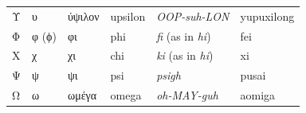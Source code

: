 \documentclass[../libro.tex]{subfiles}
\begin{document}
\begin{longtable}[c]{llllll}
    Υ     & υ     & ύψιλον  & upsilon & \textit{OOP-suh-LON}              & \textsf{yupuxilong} \\
    Φ     & φ (ϕ) & φι      & phi     & \textit{fi} (as in \textit{hi})   & \textsf{fei}        \\
    Χ     & χ     & χι      & chi     & \textit{ki} (as in \textit{hi})   & \textsf{xi}         \\
    Ψ     & ψ     & ψι      & psi     & \textit{psigh}                    & \textsf{pusai}      \\
    Ω     & ω     & ωμέγα   & omega   & \textit{oh-MAY-guh}               & \textsf{aomiga}     \\
\end{longtable}

\vspace{.5\baselineskip}\mbox{}\vfill

\clearpage
\end{document}

